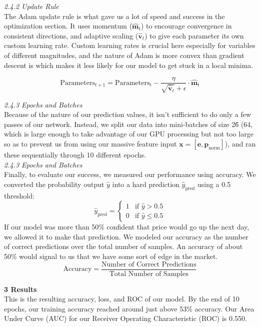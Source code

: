 \documentclass[letterpaper,12pt, twocolumn]{report}
\begin{document}
\noindent
\textit{2.4.2 Update Rule}\\
The Adam update rule is what gave us a lot of speed and success in the optimization section. It uses momentum ($\hat{\mathbf{m}}_t$) to encourage convergence in consistent directions, and adaptive scaling ($\hat{\mathbf{v}}_t$) to give each parameter its own custom learning rate. Custom learning rates is crucial here especially for variables of different magnitudes, and the nature of Adam is more convex than gradient descent is which makes it less likely for our model to get stuck in a local minima.

$$
\text{Parameters}_{t+1} = \text{Parameters}_t - \frac{\eta}{\sqrt{\hat{\mathbf{v}}_t} + \epsilon} \cdot \hat{\mathbf{m}}_t
$$

\noindent
\textit{2.4.3 Epochs and Batches}\\
Because of the nature of our prediction values, it isn't sufficient to do only a few passes of our network. Instead, we split our data into mini-batches of size 2\^6 (64, which is large enough to take advantage of our GPU processing but not too large so as to prevent us from using our massive feature input 
$\mathbf{x} = [\mathbf{e}, \mathbf{p}_{\text{norm}}]$), and ran these sequentially through 10 different epochs.\\

\noindent
\textit{2.4.3 Epochs and Batches}\\
Finally, to evaluate our success, we measured our performance using accuracy. We converted the probability output $\hat{y}$ into a hard prediction $\hat{y}_{\text{pred}}$ using a 0.5 threshold:
$$
\hat{y}_{\text{pred}} =
\begin{cases}
1 & \text{if } \hat{y} > 0.5 \\
0 & \text{if } \hat{y} \le 0.5
\end{cases}
$$
If our model was more than 50\% confident that price would go up the next day, we allowed it to make that prediction. We modeled our accuracy as the number of correct predictions over the total number of samples. An accuracy of about 50\% would signal to us that we have some sort of edge in the market.
$$
\text{Accuracy} = \frac{\text{Number of Correct Predictions}}{\text{Total Number of Samples}}
$$



\large
\noindent
\textbf{3 Results} \\
\normalsize
This is the resulting accuracy, loss, and ROC of our model. By the end of 10 epochs, our training accuracy reached around just above 53\% accuracy. Our Area Under Curve (AUC) for our Receiver Operating Characteristic (ROC) is 0.550. 
\end{document}
